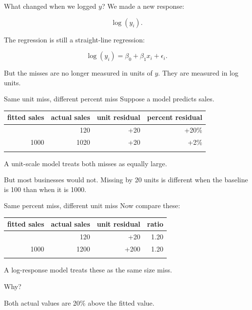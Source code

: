 \documentclass[
  ignorenonframetext,
  aspectratio=43,
]{beamer}
\begin{document}
\begin{frame}{What changed when we logged \(y\)?}
\label{what-changed-when-we-logged-y}
We made a new response:

\[
\log(y_i).
\]

The regression is still a straight-line regression:

\[
\log(y_i) = \beta_0 + \beta_1x_i + \epsilon_i.
\]

But the misses are no longer measured in units of \(y\). They are
measured in log units.
\end{frame}

\begin{frame}{Same unit miss, different percent miss}
\label{same-unit-miss-different-percent-miss}
Suppose a model predicts sales.

\begin{longtable}[]{@{}rrrr@{}}
\toprule\noalign{}
fitted sales & actual sales & unit residual & percent residual \\
\midrule\noalign{}
\endhead
100 & 120 & +20 & +20\% \\
1000 & 1020 & +20 & +2\% \\
\bottomrule\noalign{}
\end{longtable}

A unit-scale model treats both misses as equally large.

But most businesses would not. Missing by 20 units is different when the
baseline is 100 than when it is 1000.
\end{frame}

\begin{frame}{Same percent miss, different unit miss}
\label{same-percent-miss-different-unit-miss}
Now compare these:

\begin{longtable}[]{@{}rrrr@{}}
\toprule\noalign{}
fitted sales & actual sales & unit residual & ratio \\
\midrule\noalign{}
\endhead
100 & 120 & +20 & 1.20 \\
1000 & 1200 & +200 & 1.20 \\
\bottomrule\noalign{}
\end{longtable}

A log-response model treats these as the same size miss.

Why?

Both actual values are 20\% above the fitted value.
\end{frame}
\end{document}
